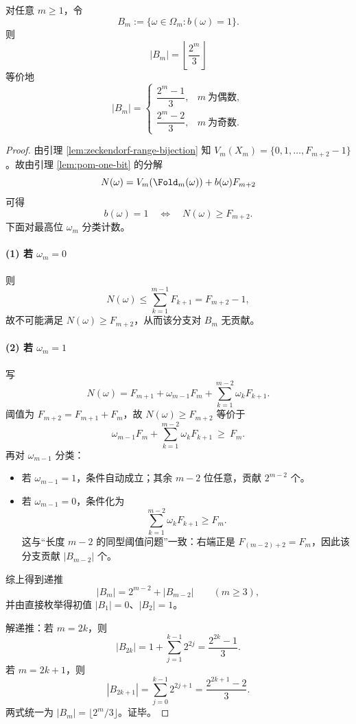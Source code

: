 \begin{theorem}[$B_m$ 的闭式计数]\label{thm:pom-hidden-bit-count}
对任意 $m\ge 1$，令
\[
B_m:=\{\omega\in\Omega_m: b(\omega)=1\}.
\]
则
$$
\boxed{\ |B_m|=\left\lfloor \frac{2^m}{3}\right\rfloor\ }
$$
等价地
$$
|B_m|=
\begin{cases}
\dfrac{2^m-1}{3}, & m\ \text{为偶数},\\[6pt]
\dfrac{2^m-2}{3}, & m\ \text{为奇数}.
\end{cases}
$$
\end{theorem}
\begin{proof}
由引理 \ref{lem:zeckendorf-range-bijection} 知 $V_m(X_m)=\{0,1,\dots,F_{m+2}-1\}$。故由引理 \ref{lem:pom-one-bit} 的分解
$$
N(\omega)=V_m(\Fold_m(\omega))+b(\omega)F_{m+2}
$$
可得
$$
b(\omega)=1\quad\Longleftrightarrow\quad N(\omega)\ge F_{m+2}.
$$
下面对最高位 $\omega_m$ 分类计数。

\paragraph{(1) 若 $\omega_m=0$}
则
$$
N(\omega)\le \sum_{k=1}^{m-1}F_{k+1}=F_{m+2}-1,
$$
故不可能满足 $N(\omega)\ge F_{m+2}$，从而该分支对 $B_m$ 无贡献。

\paragraph{(2) 若 $\omega_m=1$}
写
$$
N(\omega)=F_{m+1}+\omega_{m-1}F_m+\sum_{k=1}^{m-2}\omega_kF_{k+1}.
$$
阈值为 $F_{m+2}=F_{m+1}+F_m$，故 $N(\omega)\ge F_{m+2}$ 等价于
$$
\omega_{m-1}F_m+\sum_{k=1}^{m-2}\omega_kF_{k+1}\ \ge\ F_m.
$$
再对 $\omega_{m-1}$ 分类：
\begin{itemize}
  \item 若 $\omega_{m-1}=1$，条件自动成立；其余 $m-2$ 位任意，贡献 $2^{m-2}$ 个。
  \item 若 $\omega_{m-1}=0$，条件化为
  $$
  \sum_{k=1}^{m-2}\omega_kF_{k+1}\ge F_m.
  $$
  这与“长度 $m-2$ 的同型阈值问题”一致：右端正是 $F_{(m-2)+2}=F_m$，因此该分支贡献 $|B_{m-2}|$ 个。
\end{itemize}
综上得到递推
$$
|B_m|=2^{m-2}+|B_{m-2}|\qquad(m\ge 3),
$$
并由直接枚举得初值 $|B_1|=0$、$|B_2|=1$。

解递推：若 $m=2k$，则
$$
|B_{2k}|=1+\sum_{j=1}^{k-1}2^{2j}=\frac{2^{2k}-1}{3}.
$$
若 $m=2k+1$，则
$$
|B_{2k+1}|=\sum_{j=0}^{k-1}2^{2j+1}=\frac{2^{2k+1}-2}{3}.
$$
两式统一为 $|B_m|=\lfloor 2^m/3\rfloor$。证毕。
\end{proof}

